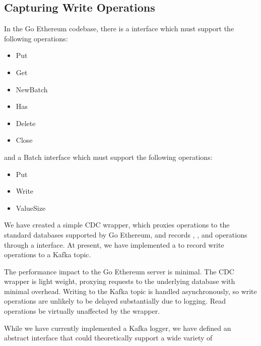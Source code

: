 \documentclass[letterpaper,10pt,english]{sphinxmanual}
\begin{document}
\subsection{Capturing Write Operations}
\label{\detokenize{topics/approach:capturing-write-operations}}
In the Go Ethereum codebase, there is a  interface which must support
the following operations:
\begin{itemize}
\item {} 
Put

\item {} 
Get

\item {} 
NewBatch

\item {} 
Has

\item {} 
Delete

\item {} 
Close

\end{itemize}

and a Batch interface which must support the following operations:
\begin{itemize}
\item {} 
Put

\item {} 
Write

\item {} 
ValueSize

\end{itemize}

We have created a simple CDC wrapper, which proxies operations to the standard
databases supported by Go Ethereum, and records , , and
 operations through a  interface. At present, we have
implemented a  to record write operations to a Kafka topic.

The performance impact to the Go Ethereum server is minimal. The CDC wrapper is
light weight, proxying requests to the underlying database with minimal
overhead. Writing to the Kafka topic is handled asynchronously, so write
operations are unlikely to be delayed substantially due to logging. Read
operations be virtually unaffected by the wrapper.

While we have currently implemented a Kafka logger, we have defined an abstract
interface that could theoretically support a wide variety of
\end{document}
